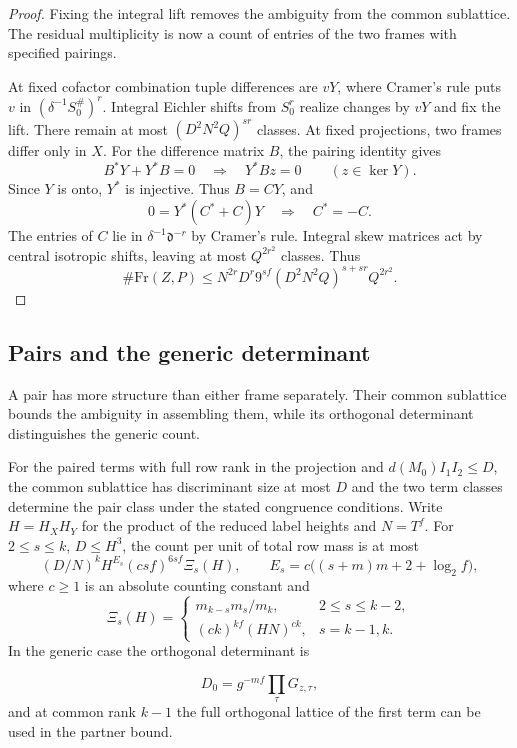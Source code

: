 \begin{proof}

Fixing the integral lift removes the ambiguity from the common sublattice. The residual multiplicity is now a count of entries of the two frames with specified pairings.


At fixed cofactor combination tuple differences are
\(vY\), where Cramer's rule puts \(v\) in
\((\delta^{-1}S_0^\#)^r\). Integral Eichler shifts
from \(S_0^r\) realize changes by \(vY\) and fix the
lift. There remain at most \((D^2N^2Q)^{sr}\)
classes. At fixed projections, two frames differ
only in \(X\). For the difference matrix \(B\), the pairing identity gives
\[
 B^*Y+Y^*B=0\quad\Longrightarrow\quad Y^*Bz=0\qquad(z\in\ker Y).
\]
 Since \(Y\)
is onto, \(Y^*\) is injective. Thus \(B=CY\), and
\[
       0=Y^*(C^*+C)Y\quad\Longrightarrow\quad C^*=-C.
\] The entries of \(C\) lie in
\(\delta^{-1}\mathfrak d^{-r}\) by Cramer's rule.
Integral skew matrices act by central isotropic
shifts, leaving at most \(Q^{2r^2}\) classes. Thus
\begin{equation}\label{eq:flag-over-P}
 \#\mathrm{Fr}(Z,P)\leq
 N^{2r}D^r9^{sf}(D^2N^2Q)^{s+sr}Q^{2r^2}.
\end{equation}

\end{proof}

\subsection{Pairs and the generic determinant}

A pair has more structure than either frame separately. Their common sublattice bounds the ambiguity in assembling them, while its orthogonal determinant distinguishes the generic count.

\begin{proposition}\label{prop:flag-pair-counts}
For the paired terms with full row rank in the projection and
\(d(M_0)I_1I_2\le D\), the common sublattice has discriminant
size at most \(D\) and the two term classes determine the pair
class under the stated congruence conditions. Write \(H=H_XH_Y\)
for the product of the reduced label heights and \(N=T^f\). For
\(2\le s\le k\), \(D\le H^3\), the count per unit of total row mass is at most
\begin{equation}\label{eq:flag-pair-mass-factor}
 (D/N)^k H^{E_s}(csf)^{6sf}\Xi_s(H),\qquad
 E_s=c\big((s+m)m+2+\log_2 f\big),
\end{equation}
where \(c\ge1\) is an absolute counting constant and
\[
 \Xi_s(H)=
 \begin{cases}
    m_{k-s}m_s/m_k,&2\le s\le k-2,\\
    (ck)^{kf}(HN)^{ck},&s=k-1,k .
 \end{cases}
\]
In the generic
case the orthogonal determinant is

\[
 D_0=g^{-mf}\prod_\tau G_{z,\tau},
\]
 and at common rank \(k-1\)
the full orthogonal lattice of the first term can be used in the
partner bound.
\end{proposition}

